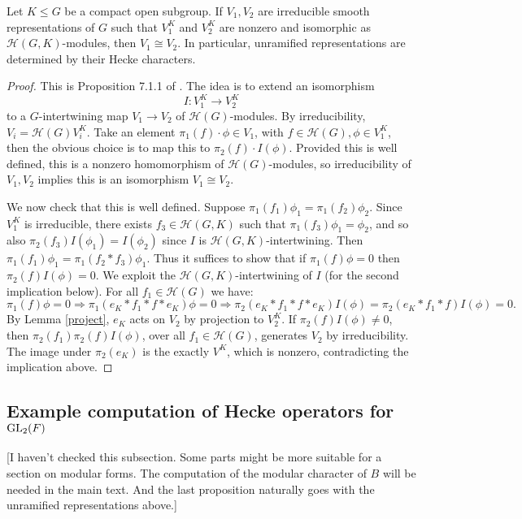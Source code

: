 \begin{prop}
    Let $K \leq G$ be a compact open subgroup. If $V_1,V_2$ are irreducible smooth representations of $G$ such that $V_1^K$ and $V_2^K$ are nonzero and isomorphic as $\mathcal H(G,K)$-modules, then $V_1 \cong V_2$. In particular, unramified representations are determined by their Hecke characters.
\end{prop}
\begin{proof}
    This is Proposition 7.1.1 of \cite{GH1}. The idea is to extend an isomorphism $$I: V_1^K \to V_2^K$$ to a $G$-intertwining map $V_1\to V_2$ of $\mathcal H(G)$-modules. By irreducibility, $V_i = \mathcal H(G)V_i^K$. Take an element $\pi_1(f) \cdot \phi \in V_1$, with $f \in \mathcal H(G), \phi \in V_1^K$, then the obvious choice is to map this to $\pi_2(f) \cdot I(\phi)$. Provided this is well defined, this is a nonzero homomorphism of $\mathcal H(G)$-modules, so irreducibility of $V_1,V_2$ implies this is an isomorphism $V_1 \cong V_2$.

    We now check that this is well defined. Suppose $\pi_1(f_1)\phi_1 = \pi_1(f_2)\phi_2$. Since $V_1^K$ is irreducible, there exists $f_3 \in \mathcal H(G,K)$ such that $\pi_1(f_3)\phi_1 = \phi_2$, and so also $\pi_2(f_3)I(\phi_1) = I(\phi_2)$ since $I$ is $\mathcal H(G,K)$-intertwining. Then $\pi_1(f_1) \phi_1 = \pi_1(f_2 * f_3) \phi_1$. Thus it suffices to show that if $\pi_1(f)\phi =0$ then $\pi_2(f)I(\phi)=0$. We exploit the $\mathcal H(G,K)$-intertwining of $I$ (for the second implication below). For all $f_1 \in \mathcal H(G)$ we have:
    $$\pi_1(f)\phi = 0 \Rightarrow \pi_1(e_K*f_1*f*e_K)\phi = 0 \Rightarrow \pi_2(e_K*f_1*f*e_K)I(\phi)=\pi_2(e_K*f_1*f)I(\phi)=0.$$
    By Lemma \ref{project}, $e_K$ acts on $V_2$ by projection to $V_2^K$. If $\pi_2(f)I(\phi) \neq 0$, then $\pi_2(f_1)\pi_2(f)I(\phi)$, over all $f_1 \in \mathcal H(G)$, generates $V_2$ by irreducibility. The image under $\pi_2(e_K)$ is the exactly $V^K$, which is nonzero, contradicting the implication above.
\end{proof}

\subsection{Example computation of Hecke operators for \texorpdfstring{$\mathrm{GL}_2(F)$}{TEXT}}

[I haven't checked this subsection. Some parts might be more suitable for a section on modular forms. The computation of the modular character of $B$ will be needed in the main text. And the last proposition naturally goes with the unramified representations above.]

